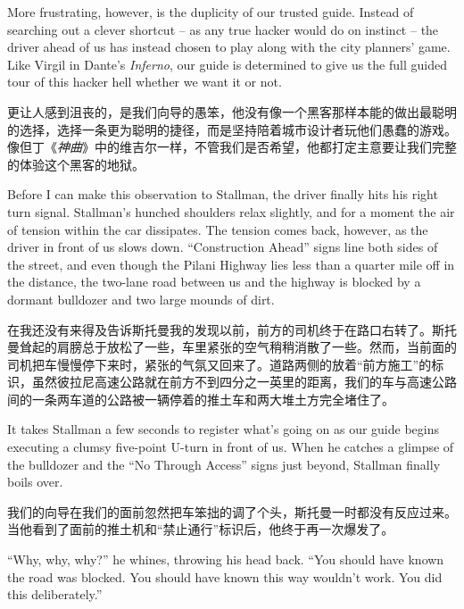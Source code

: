 \ifdefined\eng
More frustrating, however, is the duplicity of our trusted guide. Instead of searching out a clever shortcut -- as any true hacker would do on instinct -- the driver ahead of us has instead chosen to play along with the city planners' game. Like Virgil in Dante's \textit{Inferno}, our guide is determined to give us the full guided tour of this hacker hell whether we want it or not.
\fi

\ifdefined\chs
更让人感到沮丧的，是我们向导的愚笨，他没有像一个黑客那样本能的做出最聪明的选择，选择一条更为聪明的捷径，而是坚持陪着城市设计者玩他们愚蠢的游戏。像但丁《\textit{神曲}》中的维吉尔一样，不管我们是否希望，他都打定主意要让我们完整的体验这个黑客的地狱。
\fi

\ifdefined\eng
Before I can make this observation to Stallman, the driver finally hits his right turn signal. Stallman's hunched shoulders relax slightly, and for a moment the air of tension within the car dissipates. The tension comes back, however, as the driver in front of us slows down. ``Construction Ahead'' signs line both sides of the street, and even though the Pilani Highway lies less than a quarter mile off in the distance, the two-lane road between us and the highway is blocked by a dormant bulldozer and two large mounds of dirt.
\fi

\ifdefined\chs
在我还没有来得及告诉斯托曼我的发现以前，前方的司机终于在路口右转了。斯托曼耸起的肩膀总于放松了一些，车里紧张的空气稍稍消散了一些。然而，当前面的司机把车慢慢停下来时，紧张的气氛又回来了。道路两侧的放着``前方施工''的标识，虽然彼拉尼高速公路就在前方不到四分之一英里的距离，我们的车与高速公路间的一条两车道的公路被一辆停着的推土车和两大堆土方完全堵住了。
\fi

\ifdefined\eng
It takes Stallman a few seconds to register what's going on as our guide begins executing a clumsy five-point U-turn in front of us. When he catches a glimpse of the bulldozer and the ``No Through Access'' signs just beyond, Stallman finally boils over.
\fi

\ifdefined\chs
我们的向导在我们的面前忽然把车笨拙的调了个头，斯托曼一时都没有反应过来。当他看到了面前的推土机和``禁止通行''标识后，他终于再一次爆发了。
\fi

\ifdefined\eng
``Why, why, why?'' he whines, throwing his head back. ``You should have known the road was blocked. You should have known this way wouldn't work. You did this deliberately.''  %
\fi

